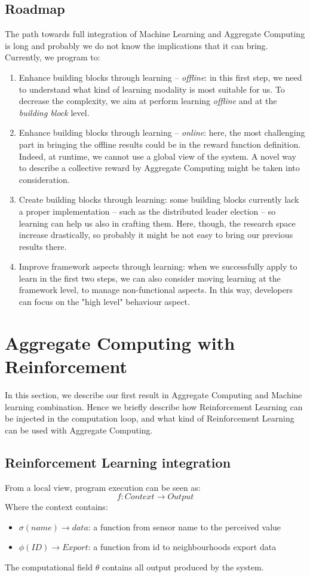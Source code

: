 \documentclass[conference]{IEEEtran}
\begin{document}
\subsection{Roadmap}
The path towards full integration of Machine Learning and Aggregate Computing is long and probably we do not know the implications that it can bring. 
Currently, we program to:
\begin{enumerate}
  \item Enhance building blocks through learning -- \textit{offline}: 
  in this first step, we need to understand what kind of learning modality is most suitable for us. 
  To decrease the complexity, we aim at perform learning \textit{offline} and at the \textit{building block} level.
  \item Enhance building blocks through learning -- \textit{online}:
  here, the most challenging part in bringing the offline results could be in the reward function definition.
  Indeed, at runtime, we cannot use a global view of the system. 
  A novel way to describe a collective reward by Aggregate Computing might be taken into consideration.
  \item Create building blocks through learning: some building blocks currently lack a proper implementation -- 
  such as the distributed leader election -- so learning can help us also in crafting them. 
  Here, though, the research space increase drastically, 
  so probably it might be not easy to bring our previous results there.
  \item Improve framework aspects through learning: 
  when we successfully apply to learn in the first two steps, 
  we can also consider moving learning at the framework level, to manage non-functional aspects. 
  In this way, developers can focus on the "high level" behaviour aspect.
\end{enumerate}

\section{Aggregate Computing with Reinforcement}
In this section, we describe our first result in Aggregate Computing and Machine learning combination.
% 
Hence we briefly describe how Reinforcement Learning can be injected in the computation loop,
 and what kind of Reinforcement Learning can be used with Aggregate Computing.

\subsection{Reinforcement Learning integration}
From a local view, program execution can be seen as:
$$
f : \textit{Context} \rightarrow \textit{Output}
$$
Where the context contains:
\begin{itemize}
  \item $\sigma(name) \rightarrow \textit{data}$: a function from sensor name to the perceived value
  \item $\phi(\textit{ID}) \rightarrow \textit{Export}$: a function from id to neighbourhoods export data
\end{itemize}
The computational field $\theta$ contains all output produced by the system.
\end{document}
